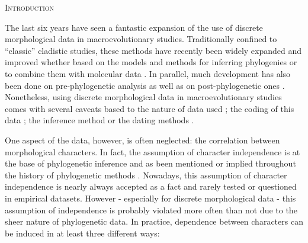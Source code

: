 \documentclass[12pt,letterpaper]{article}
\renewcommand{\section}[1]{%
\bigskip
\begin{center}
\begin{Large}
\normalfont\scshape #1
\medskip
\end{Large}
\end{center}}
\begin{document}
\section{Introduction}

The last six years have seen a fantastic expansion of the use of discrete morphological data in macroevolutionary studies.
Traditionally confined to ``classic'' cladistic studies, these methods have recently been widely expanded and improved whether based on the models and methods for inferring phylogenies \citep[e.g.][]{heath2014fossilized,Wright01072016} or to combine them with molecular data \citep[e.g.][]{pyrondivergence2011,ronquista2012}.
In parallel, much development has also been done on pre-phylogenetic analysis \citep[e.g. data collection;][]{morphobank} as well as on post-phylogenetic ones \citep[e.g. morphological disparity analysis;][]{Close2015,Claddis}.
Nonetheless, using discrete morphological data in macroevolutionary studies comes with several caveats based to the nature of data used \citep{Guillerme2016146,bapst2017combined}; the coding of this data \citep{Brazeau2011,simoes2017giant}; the inference method \citep{spencerefficacy2013,wrightbayesian2014,OReilly20160081,puttick2017uncertain,goloboff2017weighted} or the dating methods \citep{Arcila2015131,o2016tips}.

One aspect of the data, however, is often neglected: the correlation between morphological characters.
In fact, the assumption of character independence is at the base of phylogenetic inference and as been mentioned or implied throughout the history of phylogenetic methods \citep[e.g.][]{joysey1982problems,felsenstein1985phylogenies,lewisa2001,felsenstein2004inferring}.
Nowadays, this assumption of character independence is nearly always accepted as a fact and rarely tested or questioned in empirical datasets.
However - especially for discrete morphological data - this assumption of independence is probably violated more often than not due to the sheer nature of phylogenetic data.
In practice, dependence between characters can be induced in at least three different ways:
\end{document}
